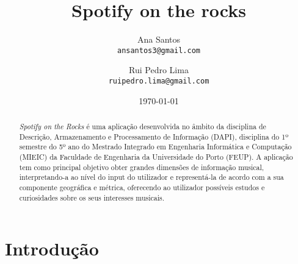 \documentclass[twocolumn,twoside,11pt,a4paper]{article}
\title{\vspace{-15mm}\fontsize{24pt}{10pt}\selectfont\textbf{Spotify on the rocks}}
\author{Ana Santos\\
\small \texttt{ansantos3@gmail.com}\\
\and
Rui Pedro Lima\\
\small \texttt{ruipedro.lima@gmail.com}
\vspace{-5mm}
}
\date{\today}
\begin{document}
\maketitle
\thispagestyle{plain}            %


\begin{abstract}


\textit{Spotify on the Rocks} é uma aplicação desenvolvida no âmbito da disciplina de Descrição,
Armazenamento e Processamento de Informação (DAPI), disciplina do 1º semestre do 5º ano
do Mestrado Integrado em Engenharia Informática e Computação (MIEIC) da Faculdade de
Engenharia da Universidade do Porto (FEUP).
A aplicação tem como principal objetivo obter grandes dimensões de informação musical,
interpretando-a ao nível do input do utilizador e representá-la de acordo com a sua
componente geográfica e métrica, oferecendo ao utilizador possíveis estudos e curiosidades
sobre os seus interesses musicais.

\end{abstract}


\section{Introdução}\label{sec:intro}

\end{document}

